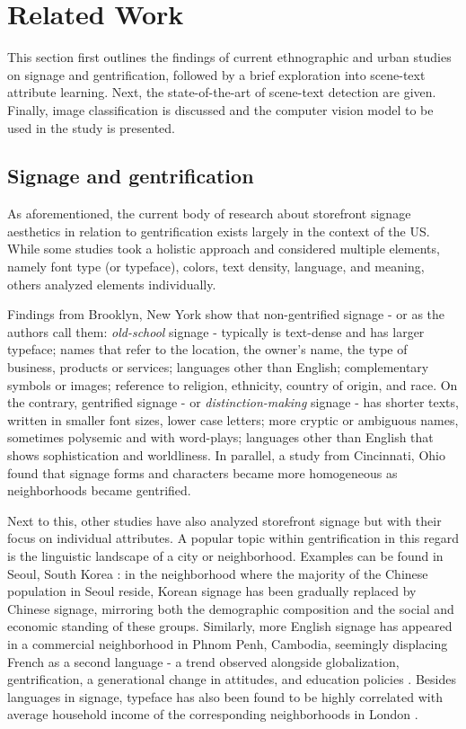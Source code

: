 \section{Related Work}
\label{sec:related_work}

This section first outlines the findings of current ethnographic and urban studies on signage and gentrification, followed by a brief exploration into scene-text attribute learning. Next, the state-of-the-art of scene-text detection are given. Finally, image classification is discussed and the computer vision model to be used in the study is presented.

\subsection{Signage and gentrification}

As aforementioned, the current body of research about storefront signage aesthetics in relation to gentrification exists largely in the context of the US. While some studies took a holistic approach and considered multiple elements, namely font type (or typeface), colors, text density, language, and meaning, others analyzed elements individually.

Findings from Brooklyn, New York\cite{trinch_signsays_2017, snajdr_oldschool_2018, snajdr_preserve_2022} show that non-gentrified signage - or as the authors call them: \textit{old-school} signage - typically is text-dense and has larger typeface; names that refer to the location, the owner's name, the type of business, products or services; languages other than English; complementary symbols or images; reference to religion, ethnicity, country of origin, and race. On the contrary, gentrified signage - or \textit{distinction-making} signage - has shorter texts, written in smaller font sizes, lower case letters; more cryptic or ambiguous names, sometimes polysemic and with word-plays; languages other than English that shows sophistication and worldliness. In parallel, a study from Cincinnati, Ohio \cite{rahman_signage_2020} found that signage forms and characters became more homogeneous as neighborhoods became gentrified.

Next to this, other studies have also analyzed storefront signage but with their focus on individual attributes. A popular topic within gentrification in this regard is the linguistic landscape of a city or neighborhood. Examples can be found in Seoul, South Korea \cite{hong_linguistic_2020}: in the neighborhood where the majority of the Chinese population in Seoul reside, Korean signage has been gradually replaced by Chinese signage, mirroring both the demographic composition and the social and economic standing of these groups. Similarly, more English signage has appeared in a commercial neighborhood in Phnom Penh, Cambodia, seemingly displacing French as a second language - a trend observed alongside globalization, gentrification, a generational change in attitudes, and education policies \cite{kasanga_map_2012}. Besides languages in signage, typeface has also been found to be highly correlated with average household income of the corresponding neighborhoods in London \cite{ma_typef_2019}.

